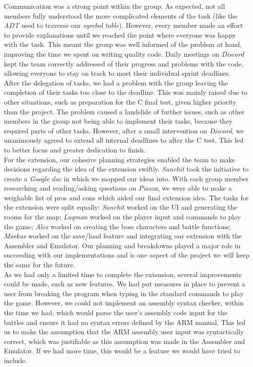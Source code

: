 \documentclass[10pt]{article}
\begin{document}
Communication was a strong point within the group. As expected, not all members fully understood the more complicated elements of the task (like the {\sl ADT} used to traverse our {\sl symbol table}). However, every member made an effort to provide explanations until we reached the point where everyone was happy with the task. This meant the group was well informed of the problem at hand, improving the time we spent on writing quality code. Daily meetings on {\sl Discord} kept the team correctly addressed of their progress and problems with the code, allowing everyone to stay on track to meet their individual sprint deadlines. 
\\

After the delegation of tasks, we had a problem with the group leaving the completion of their tasks too close to the deadline. This was mainly raised due to other situations, such as preparation for the C final test, given higher priority than the project. The problem caused a landslide of further issues, such as other members in the group not being able to implement their tasks, because they required parts of other tasks. However, after a small intervention on {\sl Discord}, we unanimously agreed to extend all internal deadlines to after the C test. This led to better focus and greater dedication to finish. 
\\

For the extension, our cohesive planning strategies enabled the team to make decisions regarding the idea of the extension swiftly. {\sl Sanchit} took the initiative to create a {\sl Google doc} in which we mapped our ideas into. With each group member researching and reading/asking questions on {\sl Piazza}, we were able to make a weighable list of pros and cons which aided our final extension idea. The tasks for the extension were split equally: {\sl Sanchit} worked on the UI and generating the rooms for the map; {\sl Luqman} worked on the player input and commands to play the game; {\sl Alex} worked on creating the boss characters and battle functions; {\sl Morkus} worked on the save/load feature and integrating our extension with the Assembler and Emulator. Our planning and breakdowns played a major role in succeeding with our implementations and is one aspect of the project we will keep the same for the future. 
\\

As we had only a limited time to complete the extension, several improvements could be made, such as new features. We had put measures in place to prevent a user from breaking the program when typing in the standard commands to play the game. However, we could not implement an assembly syntax checker, within the time we had, which would parse the user’s assembly code input for the battles and ensure it had no syntax errors defined by the ARM manual. This led us to make the assumption that the ARM assembly user input was syntactically correct, which was justifiable as this assumption was made in the Assembler and Emulator. If we had more time, this would be a feature we would have tried to include. 
\\
\end{document}
